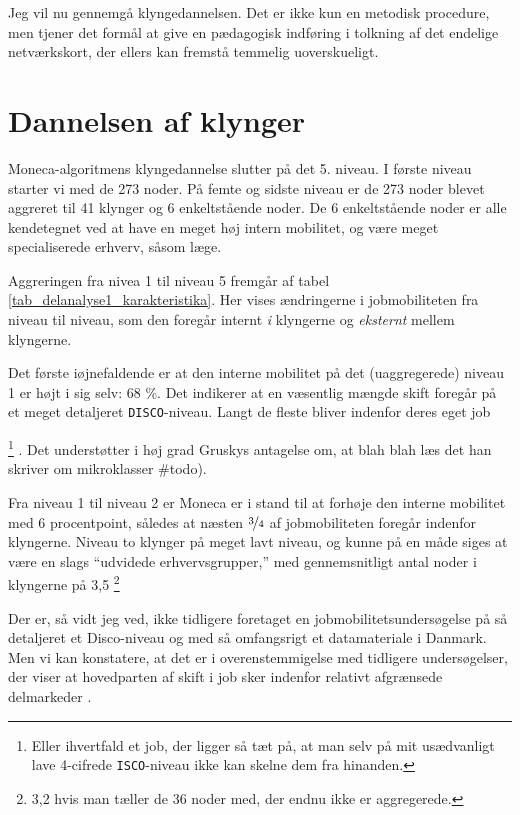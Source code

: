 Jeg vil nu gennemgå klyngedannelsen. Det er ikke kun en metodisk procedure, men tjener det formål at give en pædagogisk indføring i tolkning af det endelige netværkskort, der ellers kan fremstå temmelig uoverskueligt. 

\section{Dannelsen af klynger \label{delanalyse1_segmenteringsprocessen}}

Moneca-algoritmens klyngedannelse slutter på det 5. niveau. I første niveau starter vi med de 273 noder. På femte og sidste niveau er de 273 noder blevet aggreret til 41 klynger og 6 enkeltstående noder. De 6 enkeltstående noder er alle kendetegnet ved at have en meget høj intern mobilitet, og være meget specialiserede erhverv, såsom læge. 


Aggreringen fra nivea 1 til niveau 5 fremgår af tabel \ref{tab_delanalyse1_karakteristika}. Her vises ændringerne i jobmobiliteten fra niveau til niveau, som den foregår internt \emph{i} klyngerne og \emph{eksternt} mellem klyngerne.

% 

% 

Det første iøjnefaldende er at den interne mobilitet på det (uaggregerede) niveau 1 er højt i sig selv: 68 \%. Det indikerer at en væsentlig mængde skift foregår på et meget detaljeret \texttt{DISCO}-niveau. Langt de fleste bliver indenfor deres eget job%
%

\footnote{Eller ihvertfald et job, der ligger så tæt på, at man selv på mit usædvanligt lave 4-cifrede \texttt{ISCO}-niveau ikke kan skelne dem fra hinanden.}%
%
. Det understøtter i høj grad Gruskys antagelse om, at blah blah læs det han skriver om mikroklasser \#todo). 

Fra niveau 1 til niveau 2 er Moneca er i stand til at forhøje den interne mobilitet med 6 procentpoint, således at næsten $\nicefrac{3}{4}$ af jobmobiliteten foregår indenfor klyngerne. Niveau to klynger på meget lavt niveau, og kunne på en måde siges at være en slags “udvidede erhvervsgrupper,” med gennemsnitligt antal noder i klyngerne på 3,5%
%
\footnote{ 3,2 hvis man tæller de 36 noder med, der endnu ikke er aggregerede.}%
%


Der er, så vidt jeg ved, ikke tidligere foretaget en jobmobilitetsundersøgelse på så detaljeret et Disco-niveau og med så omfangsrigt et datamateriale i Danmark. Men vi kan konstatere, at det er i overenstemmigelse med tidligere undersøgelser, der viser at hovedparten af skift i job sker indenfor relativt afgrænsede delmarkeder \parencite[124]{BojeToft1989}. 

